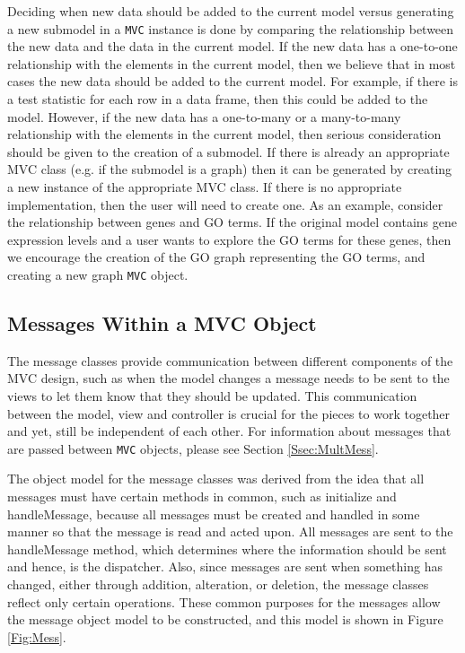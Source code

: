 \documentclass{article}[11pt]
\newcommand{\Rfunction}[1]{{\textsf{#1}}}
\newcommand{\Robject}[1]{{\texttt{#1}}}
\begin{document}
Deciding when new data should be added to the current model versus generating
a new submodel in a \Robject{MVC} instance is done by comparing the
relationship between the new data and the data in the current model.  If the
new data has a one-to-one relationship with the elements in the current model,
then we believe that in most cases the new data should be added to the 
current model.  For example, if there is
a test statistic for each row in a data frame, then this could be added to the
model.  However, if the new data has a one-to-many or a many-to-many
relationship with the elements in the current model, then serious
consideration should be given to the creation of a submodel.  If there is
already an appropriate MVC class (e.g. if the submodel is a graph) then it can
be generated by creating a new instance of the appropriate MVC class.  If there
is no appropriate implementation, then the user will need to create one.  
As an example, consider the
relationship between genes and GO terms.  If the original model contains gene
expression levels and a user wants to explore the GO terms for these genes,
then we encourage the creation of the GO graph representing the GO terms, and
creating a new graph \Robject{MVC} object.

\subsection{Messages Within a MVC Object}
\label{Ssec:OneMess}

The message classes provide communication between different
components of the MVC design, such as when the model changes a message needs
to be sent to the views to let them know that they should be updated.  This
communication between the model, view and controller is crucial for the pieces
to work together and yet, still be independent of each other.  For information
about messages that are passed between \Robject{MVC} objects, please see
Section \ref{Ssec:MultMess}. 

The object model for the message classes was derived from the idea
that all messages must have certain methods in common, such as
\Rfunction{initialize} and \Rfunction{handleMessage}, because all
messages must be created and handled in some manner so that the
message is read and acted upon.  All messages are sent to
the \Rfunction{handleMessage} method, which determines where the information
should be sent and hence, is the dispatcher.   Also, since messages
are sent when something has changed, either through addition, alteration, or
deletion, the message classes reflect only certain operations.  These
common purposes for the messages allow the message object
model to be constructed, and this model is shown in Figure \ref{Fig:Mess}.
\end{document}

